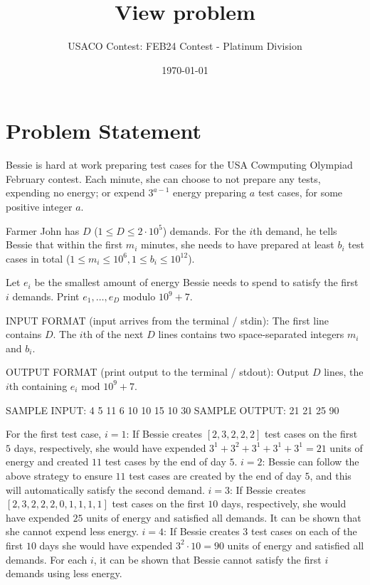 \documentclass[12pt]{article}
\title{View problem}
\author{USACO Contest: FEB24 Contest - Platinum Division}
\date{\today}
\begin{document}
\maketitle

\section*{Problem Statement}


Bessie is hard at work preparing test cases for the USA Cowmputing Olympiad
February contest. Each minute, she can choose to not prepare any tests,
expending no energy; or expend $3^{a-1}$ energy preparing $a$ test cases, for
some positive integer $a$.

Farmer John has $D$ ($1\le D\le 2\cdot 10^5$) demands. For the $i$th demand, he
tells Bessie that within the first $m_i$ minutes, she needs to have prepared  at
least $b_i$ test cases in total ($1\le m_i\le 10^6, 1 \leq b_i \leq 10^{12}$).

Let $e_i$ be the smallest amount of energy Bessie needs to spend to satisfy the
first $i$ demands. Print $e_1,\dots,e_D$ modulo $10^9+7$.

INPUT FORMAT (input arrives from the terminal / stdin):
The first line contains $D$. The $i$th of the next $D$ lines contains two
space-separated integers $m_i$ and $b_i$.

OUTPUT FORMAT (print output to the terminal / stdout):
Output $D$ lines, the $i$th containing $e_i \text{ mod } 10^9+7$.

SAMPLE INPUT:
4
5 11
6 10
10 15
10 30
SAMPLE OUTPUT: 
21
21
25
90

For the first test case, 
 $i=1$: If Bessie creates $[2, 3, 2, 2, 2]$ test cases on the first $5$
days, respectively, she would have expended $3^1 + 3^2 + 3^1 + 3^1 + 3^1 = 21$
units of energy and created $11$ test cases by the end of day $5$. 
$i=2$: Bessie can follow the above strategy to ensure $11$ test cases are
created by the end of day $5$, and this will automatically satisfy the second
demand. $i=3$: If Bessie creates $[2, 3, 2, 2, 2, 0, 1, 1, 1, 1]$ test
cases on the first $10$ days, respectively, she would have expended $25$ units
of energy and satisfied all demands. It can be shown that she cannot expend less
energy. $i=4$: If Bessie creates 3 test cases on each of the first
$10$ days she would have expended $3^{2}\cdot 10 = 90$ units of energy and
satisfied all demands. 
For each $i$, it can be shown that Bessie cannot satisfy the first $i$ demands using
less energy.
\end{document}

